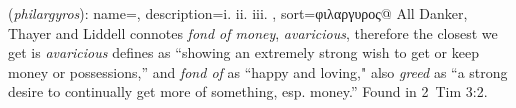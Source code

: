 \item[Moneyphile,]

(\textit{philargyros}):
{
    name=,
    description={i.  ii.  iii. },
    sort=φιλαργυρος@
}
All Danker, Thayer and Liddell connotes \emph{fond of money}, \emph{avaricious}, therefore the closest we get is \emph{avaricious} defines as ``showing an extremely strong wish to get or keep money or possessions,'' and \emph{fond of} as ``happy and loving," also \emph{greed} as ``a strong desire to continually get more of something, esp. money.''
Found in 2~Tim 3:2.
